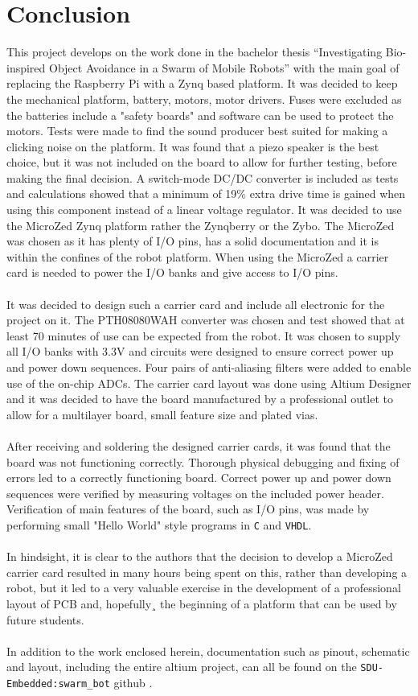 \section{Conclusion}
This project develops on the work done in the bachelor thesis ``Investigating Bio-inspired Object Avoidance in a Swarm of Mobile Robots'' with the main goal of replacing the Raspberry Pi with a Zynq based platform.
It was decided to keep the mechanical platform, battery, motors, motor drivers.
Fuses were excluded as the batteries include a "safety boards" and software can be used to protect the motors.
Tests were made to find the sound producer best suited for making a clicking noise on the platform.
It was found that a piezo speaker is the best choice, but it was not included on the board to allow for further testing, before making the final decision.
A switch-mode DC/DC converter is included as tests and calculations showed that a minimum of 19\% extra drive time is gained when using this component instead of a linear voltage regulator.
It was decided to use the MicroZed Zynq platform rather the Zynqberry or the Zybo.
The MicroZed was chosen as it has plenty of I/O pins, has a solid documentation and it is within the confines of the robot platform.
When using the MicroZed a carrier card is needed to power the I/O banks and give access to I/O pins.
\\~\\
It was decided to design such a carrier card and include all electronic for the project on it. 
The PTH08080WAH converter was chosen and test showed that at least 70 minutes of use can be expected from the robot.
It was chosen to supply all I/O banks with 3.3V and circuits were designed to ensure correct power up and power down sequences. 
Four pairs of anti-aliasing filters were added to enable use of the on-chip ADCs. 
The carrier card layout was done using Altium Designer and it was decided to have the board manufactured by a professional outlet to allow for a multilayer board, small feature size and plated vias.
\\~\\
After receiving and soldering the designed carrier cards, it was found that the board was not functioning correctly.
Thorough physical debugging and fixing of errors led to a correctly functioning board. 
Correct power up and power down sequences were verified by measuring voltages on the included power header. 
Verification of main features of the board, such as I/O pins, was made by performing small "Hello World" style programs in \texttt{C} and \texttt{VHDL}.
\\~\\
In hindsight, it is clear to the authors that the decision to develop a MicroZed carrier card resulted in many hours being spent on this, rather than developing a robot, but it led to a very valuable exercise in the development of a professional layout of PCB and, hopefully¸ the beginning of a platform that can be used by future students.
\\~\\
In addition to the work enclosed herein, documentation such as pinout, schematic and layout, including the entire altium project, can all be found on the \texttt{SDU-Embedded:swarm\_bot} github \cite{github}.